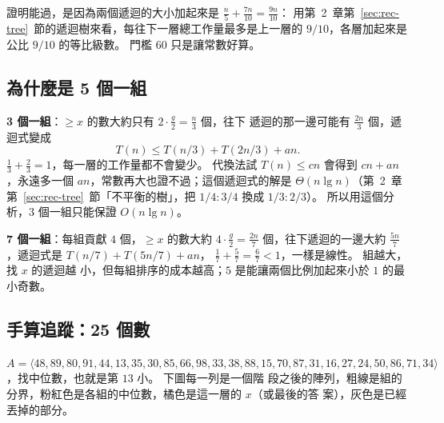 證明能過，是因為兩個遞迴的大小加起來是 $\frac{n}{5} + \frac{7n}{10} = \frac{9n}{10}$：
用第~2~章第~\ref{sec:rec-tree}~節的遞迴樹來看，每往下一層總工作量最多是上一層的 $9/10$，各層加起來是
公比 $9/10$ 的等比級數。 門檻 $60$ 只是讓常數好算。

\subsection{為什麼是 5 個一組}

\textbf{3 個一組}：$\ge x$ 的數大約只有 $2 \cdot \frac{g}{2} = \frac{n}{3}$ 個，往下
遞迴的那一邊可能有 $\frac{2n}{3}$ 個，遞迴式變成
\[
T(n) \le T(n/3) + T(2n/3) + an.
\]
$\frac{1}{3} + \frac{2}{3} = 1$，每一層的工作量都不會變少。 代換法試 $T(n) \le cn$
會得到 $cn + an$，永遠多一個 $an$，常數再大也證不過；這個遞迴式的解是
$\Theta(n \lg n)$（第~2~章第~\ref{sec:rec-tree}~節「不平衡的樹」，把 $1/4 : 3/4$ 換成 $1/3 : 2/3$）。
所以用這個分析，$3$ 個一組只能保證 $O(n \lg n)$。

\textbf{7 個一組}：每組貢獻 $4$ 個，$\ge x$ 的數大約 $4 \cdot \frac{g}{2} = \frac{2n}{7}$
個，往下遞迴的一邊大約 $\frac{5n}{7}$，遞迴式是 $T(n/7) + T(5n/7) + an$，
$\frac{1}{7} + \frac{5}{7} = \frac{6}{7} < 1$，一樣是線性。 組越大，找 $x$ 的遞迴越
小，但每組排序的成本越高；$5$ 是能讓兩個比例加起來小於 $1$ 的最小奇數。

\subsection{手算追蹤：25 個數}
\label{sec:sel-mom-trace}

$A = \langle 48, 89, 80, 91, 44, 13, 35, 30, 85, 66, 98, 33, 38, 88, 15, 70, 87, 31,
16, 27, 24, 50, 86, 71, 34 \rangle$，找中位數，也就是第 $13$ 小。 下圖每一列是一個階
段之後的陣列，粗線是組的分界，粉紅色是各組的中位數，橘色是這一層的 $x$（或最後的答
案），灰色是已經丟掉的部分。

